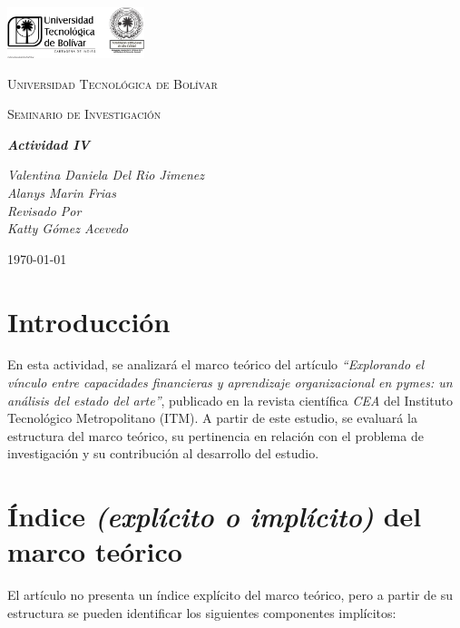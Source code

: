 \documentclass[letterpaper, 11pt]{report}
\begin{document}
\begin{titlepage}
      \centering
      \includegraphics[width=0.3\textwidth]{Images/logo_utb.png}\par\vspace{1cm}
      {\scshape\LARGE Universidad Tecnológica de Bolívar \par}
      \vspace{1cm}

      {\scshape\Large Seminario de Investigación \par}
      \vspace{1cm}

      \slshape {\Large \bfseries{} Actividad IV\\}
      \vspace{2cm}

      \slshape {\itshape{} Valentina Daniela Del Rio Jimenez \\}
      \slshape {\itshape{} Alanys Marin Frias \\}
      \vfill
      Revisado Por \\
      Katty Gómez Acevedo\\
      {\large \today\par}
\end{titlepage}

\nocite{*}

\section*{Introducción}

En esta actividad, se analizará el marco teórico del artículo
\textit{``Explorando el vínculo entre capacidades financieras y aprendizaje
      organizacional en pymes: un análisis del estado del arte''}, publicado en la
revista científica \textit{CEA} del Instituto Tecnológico Metropolitano (ITM).
A partir de este estudio, se evaluará la estructura del marco teórico, su
pertinencia en relación con el problema de investigación y su contribución al
desarrollo del estudio.

\section*{Índice \textit{(explícito o implícito)} del marco teórico}

El artículo no presenta un índice explícito del marco teórico, pero a partir de
su estructura se pueden identificar los siguientes componentes implícitos:
\end{document}
